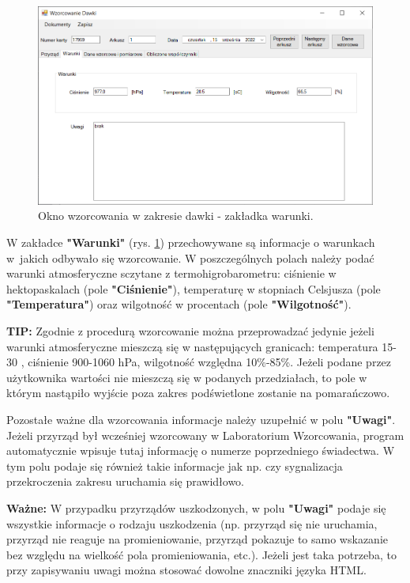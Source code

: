 \begin{figure}[htb]
	\centering
	\includegraphics[width=\columnwidth]{obrazki/Wzorcowanie/dawka/warunki.png}
	\caption{Okno wzorcowania w zakresie dawki - zakładka warunki.}
	\label{dawkaWarunki}
\end{figure}

W zakładce \textbf{"Warunki"} (rys. \ref{dawkaWarunki}) przechowywane są informacje o warunkach w~jakich odbywało się wzorcowanie. W poszczególnych polach należy podać warunki atmosferyczne sczytane z termohigrobarometru: ciśnienie w hektopaskalach (pole \textbf{"Ciśnienie"}), temperaturę w stopniach Celsjusza (pole \textbf{"Temperatura"}) oraz wilgotność w procentach (pole \textbf{"Wilgotność"}).

\textbf{TIP:} Zgodnie z procedurą wzorcowanie można przeprowadzać jedynie jeżeli warunki atmosferyczne mieszczą się w następujących granicach: temperatura 15-30 \textcelsius, ciśnienie 900-1060 hPa,  wilgotność względna 10\%-85\%. Jeżeli podane przez użytkownika wartości nie mieszczą się w podanych przedziałach, to pole w którym nastąpiło wyjście poza zakres podświetlone zostanie na pomarańczowo.

Pozostałe ważne dla wzorcowania informacje należy uzupełnić w polu \textbf{"Uwagi"}. Jeżeli przyrząd był wcześniej wzorcowany w Laboratorium Wzorcowania, program automatycznie wpisuje tutaj informację o numerze poprzedniego świadectwa. W tym polu podaje się również takie informacje jak np. czy sygnalizacja przekroczenia zakresu uruchamia się prawidłowo. 

\textbf{Ważne:} W przypadku przyrządów uszkodzonych, w polu \textbf{"Uwagi"} podaje się wszystkie informacje o rodzaju uszkodzenia (np. przyrząd się nie uruchamia, przyrząd nie reaguje na promieniowanie, przyrząd pokazuje to samo wskazanie bez względu na wielkość pola promieniowania, etc.). Jeżeli jest taka potrzeba, to przy zapisywaniu uwagi można stosować dowolne znaczniki języka HTML.

